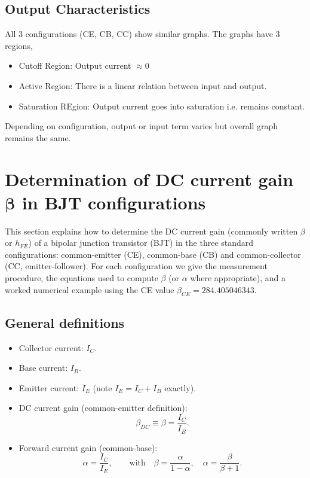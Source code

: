 \documentclass[12pt,a4paper]{article}
\begin{document}
\subsection{Output Characteristics}
All 3 configurations (CE, CB, CC) show similar graphs. The graphs have 3 regions,
\begin{itemize}
    \item Cutoff Region: Output current $\approx 0$
    \item Active Region: There is a linear relation between input and output.
    \item Saturation REgion: Output current goes into saturation i.e. remains constant.
\end{itemize}
Depending on configuration, output or input term varies but overall graph remains the same.

\section{Determination of DC current gain $\boldsymbol{\beta}$ in BJT configurations}

This section explains how to determine the DC current gain (commonly written $\beta$ or $h_{FE}$) of a bipolar junction transistor (BJT) in the three standard configurations: common-emitter (CE), common-base (CB) and common-collector (CC, emitter-follower). For each configuration we give the measurement procedure, the equations used to compute $\beta$ (or $\alpha$ where appropriate), and a worked numerical example using the CE value $\beta_{CE}=284.405046343$.  

\subsection{General definitions}
\begin{itemize}
  \item Collector current: $I_C$.
  \item Base current: $I_B$.
  \item Emitter current: $I_E$ (note $I_E=I_C+I_B$ exactly).
  \item DC current gain (common-emitter definition):
    \begin{equation}
      \beta_{DC} \equiv \beta = \frac{I_C}{I_B}.
    \end{equation}
  \item Forward current gain (common-base):
    \begin{equation}
      \alpha = \frac{I_C}{I_E}, \qquad \text{with}\quad \beta=\frac{\alpha}{1-\alpha},\quad \alpha=\frac{\beta}{\beta+1}.
    \end{equation}
\end{itemize}
\end{document}
